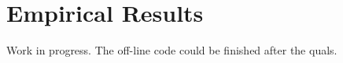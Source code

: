 \documentclass{article}
\theoremstyle{plain}
\theoremstyle{plain} %
\theoremstyle{definition}  %
\theoremstyle{remark}  %
\theoremstyle{plain}
\begin{document}




\section{Empirical Results}
Work in progress. The off-line code could be finished after the quals.
\end{document}
